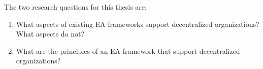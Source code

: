 The two research questions for this thesis are:

\begin{enumerate}
\item What aspects of existing EA frameworks support decentralized organizations? What aspects do not?
\label{req:1}
\item What are the principles of an EA framework that support decentralized organizations?
\label{req:2}
\end{enumerate}
